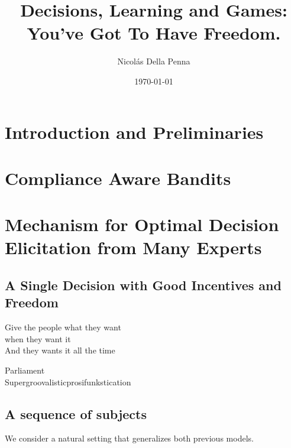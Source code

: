\documentclass[11pt, a4paper]{book}
\title{Decisions, Learning and Games: \\ You've Got To Have Freedom.}
\author{Nicol\'as Della Penna}
\date{\today}
\begin{document}
\pagestyle{empty}
\thispagestyle{empty}



\cleardoublepage
\pagestyle{empty}


\cleardoublepage
\pagestyle{empty}


\cleardoublepage
\pagestyle{headings}


\cleardoublepage
\pagestyle{headings}
\tableofcontents
\listoffigures
\listoftables

\mainmatter
\part{Introduction and Preliminaries}


\part{Compliance Aware Bandits}





%








\part{Mechanism for Optimal Decision Elicitation from Many Experts}
\chapter{A Single Decision with Good Incentives and Freedom}
\label{cha:market}
\epigraph{Give the people what they want\\ when they want it \\
And they wants it all the time}{Parliament \\ Supergroovalisticprosifunkstication}

\chapter{A sequence of subjects}
We consider a natural setting that generalizes both previous models.

%



\backmatter




\printindex
\end{document}
